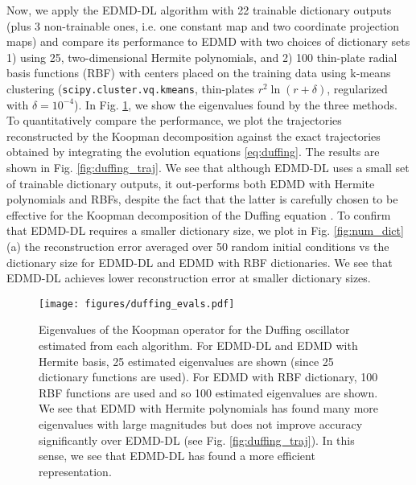 \documentclass[%
 aip,
 cha,
 sd,%
 amsmath,amssymb,
 preprint,%
]{revtex4-1}
\begin{document}
Now, we apply the EDMD-DL algorithm with 22 trainable dictionary outputs (plus 3 non-trainable ones, i.e. one constant map and two coordinate projection maps) and compare its performance to EDMD with two choices of dictionary sets 1) using 25, two-dimensional Hermite polynomials, and 2) 100 thin-plate radial basis functions (RBF) with centers placed on the training data using k-means clustering (\texttt{scipy.cluster.vq.kmeans}, thin-plates $r^2\ln(r+\delta)$, regularized with $\delta=10^{-4}$). In Fig. \ref{fig:duffing_evals}, we show the eigenvalues found by the three methods. To quantitatively compare the performance, we plot the trajectories reconstructed by the Koopman decomposition against the exact trajectories obtained by integrating the evolution equations \eqref{eq:duffing}. The results are shown in Fig. \ref{fig:duffing_traj}. We see that although EDMD-DL uses a small set of trainable dictionary outputs, it out-performs both EDMD with Hermite polynomials and RBFs, despite the fact that the latter is carefully chosen to be effective for the Koopman decomposition of the Duffing equation \cite{williams2015data}. To confirm that EDMD-DL requires a smaller dictionary size, we plot in Fig. \ref{fig:num_dict}(a) the reconstruction error averaged over 50 random initial conditions vs the dictionary size for EDMD-DL and EDMD with RBF dictionaries. We see that EDMD-DL achieves lower reconstruction error at smaller dictionary sizes. 
\begin{figure}
	\begin{center}
		\texttt{[image: figures/duffing\_evals.pdf]}
	\end{center}
	\caption{Eigenvalues of the Koopman operator for the Duffing oscillator estimated from each algorithm. For EDMD-DL and EDMD with Hermite basis, 25 estimated eigenvalues are shown (since 25 dictionary functions are used). For EDMD with RBF dictionary, 100 RBF functions are used and so 100 estimated eigenvalues are shown. We see that EDMD with Hermite polynomials has found many more eigenvalues with large magnitudes but does not improve accuracy significantly over EDMD-DL (see Fig. \ref{fig:duffing_traj}). In this sense, we see that EDMD-DL has found a more efficient representation. }
	\label{fig:duffing_evals}
\end{figure}
\end{document}

